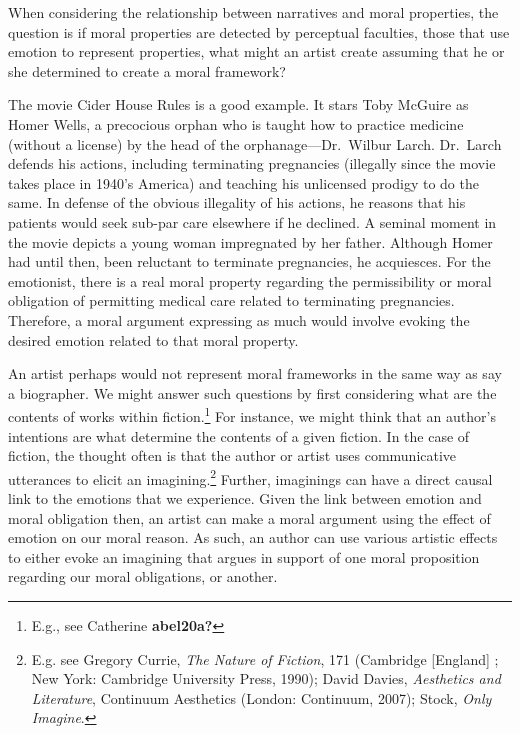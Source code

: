 \documentclass[
  12pt,
]{book}
\theoremstyle{definition}
\theoremstyle{definition}
\theoremstyle{definition}
\theoremstyle{definition}
\theoremstyle{remark}
\begin{document}
When considering the relationship between narratives and moral properties, the question is if moral properties are detected by perceptual faculties, those that use emotion to represent properties, what might an artist create assuming that he or she determined to create a moral framework?

The movie Cider House Rules is a good example. It stars Toby McGuire as Homer Wells, a precocious orphan who is taught how to practice medicine (without a license) by the head of the orphanage---Dr.~Wilbur Larch. Dr.~Larch defends his actions, including terminating pregnancies (illegally since the movie takes place in 1940's America) and teaching his unlicensed prodigy to do the same. In defense of the obvious illegality of his actions, he reasons that his patients would seek sub-par care elsewhere if he declined. A seminal moment in the movie depicts a young woman impregnated by her father. Although Homer had until then, been reluctant to terminate pregnancies, he acquiesces. For the emotionist, there is a real moral property regarding the permissibility or moral obligation of permitting medical care related to terminating pregnancies. Therefore, a moral argument expressing as much would involve evoking the desired emotion related to that moral property.

An artist perhaps would not represent moral frameworks in the same way as say a biographer. We might answer such questions by first considering what are the contents of works within fiction.\footnote{E.g., see Catherine \textbf{abel20a?}} For instance, we might think that an author's intentions are what determine the contents of a given fiction. In the case of fiction, the thought often is that the author or artist uses communicative utterances to elicit an imagining.\footnote{E.g. see Gregory Currie, \emph{The Nature of Fiction}, 171 (Cambridge {[}England{]} ; New York: Cambridge University Press, 1990); David Davies, \emph{Aesthetics and Literature}, Continuum Aesthetics (London: Continuum, 2007); Stock, \emph{Only Imagine}.} Further, imaginings can have a direct causal link to the emotions that we experience. Given the link between emotion and moral obligation then, an artist can make a moral argument using the effect of emotion on our moral reason. As such, an author can use various artistic effects to either evoke an imagining that argues in support of one moral proposition regarding our moral obligations, or another.
\end{document}
